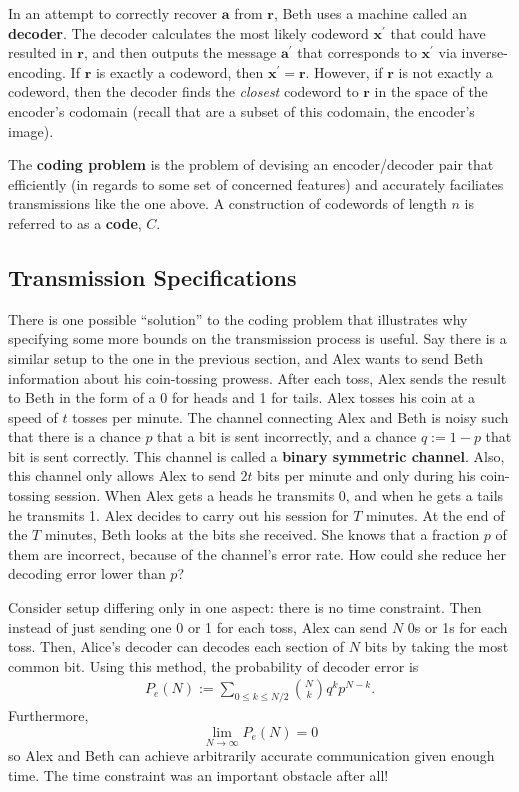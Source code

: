 \documentclass{article}
\renewcommand{\=}{\equiv}
\newcommand{\ra}{\rightarrow}
\newcommand{\p}{^\prime}
\renewcommand{\v}{\mathbf}
\newcommand{\x}{{\v x}}
\theoremstyle{plain}
\theoremstyle{definition}
\begin{document}
In an attempt to correctly recover $\v a$ from $\v r$, Beth uses a machine called an \textbf{decoder}.
The decoder calculates the most likely codeword $\x\p$ that could have resulted in $\v r$,
and then outputs the message $\v a\p$ that corresponds to $\x\p$ via inverse-encoding.
If $\v r$ is exactly a codeword, then $\x\p = \v r$.
However, if $\v r$ is not exactly a codeword, then the decoder finds the \textit{closest} codeword to $\v r$ in the space of the encoder's codomain (recall that are a subset of this codomain, the encoder's image).

The \textbf{coding problem} is the problem of devising an encoder/decoder pair that efficiently (in regards to some set of concerned features) and accurately faciliates transmissions like the one above. A construction of codewords of length $n$ is referred to as a \textbf{code}, $C$.

\subsection{Transmission Specifications}
\label{sec:trans-spec}

There is one possible ``solution'' to the coding problem that illustrates why specifying some more bounds on the transmission process is useful.
Say there is a similar setup to the one in the previous section, and Alex wants to send Beth information about his coin-tossing prowess.
After each toss, Alex sends the result to Beth in the form of a 0 for heads and 1 for tails.
Alex tosses his coin at a speed of $t$ tosses per minute.
The channel connecting Alex and Beth is noisy such that there is a chance $p$ that a bit is sent incorrectly, and a chance $q := 1-p$  that bit is sent correctly.
This channel is called a \textbf{binary symmetric channel}.
Also, this channel only allows Alex to send $2t$ bits per minute and only during his coin-tossing session.
When Alex gets a heads he transmits 0, and when he gets a tails he transmits 1.
Alex decides to carry out his session for $T$ minutes.
At the end of the $T$ minutes, Beth looks at the bits she received.
She knows that a fraction $p$ of them are incorrect, because of the channel's error rate. How could she reduce her decoding error lower than $p$?

Consider setup differing only in one aspect: there is no time constraint.
Then instead of just sending one 0 or 1 for each toss, Alex can send $N$ 0s or 1s for each toss.
Then, Alice's decoder can decodes each section of $N$ bits by taking the most common bit.
Using this method, the probability of decoder error is
\begin{align}
  P_e(N) := \sum_{0 \leq k \leq N/2} \binom{N}{k} q^k p^{N-k}.
\end{align}
Furthermore,
$$ \lim_{N \ra \infty} P_e(N) = 0 $$
so Alex and Beth can achieve arbitrarily accurate communication given enough time.
The time constraint was an important obstacle after all!
\end{document}
